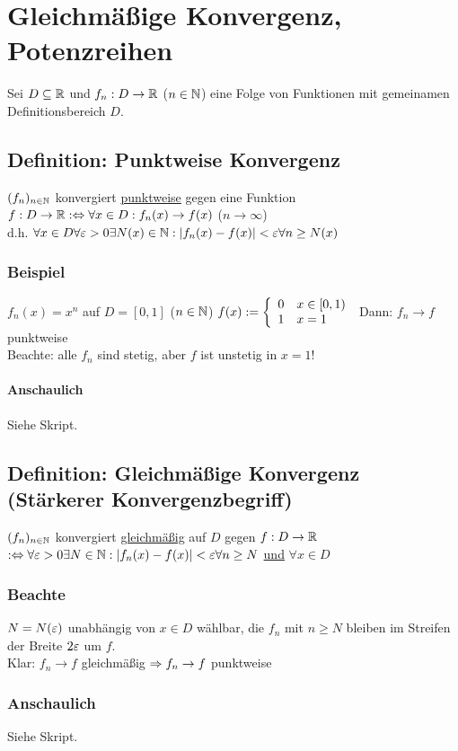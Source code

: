 \chapter{Gleichmäßige Konvergenz, Potenzreihen}\label{P13}
Sei $D \subseteq \mathbb{R}$ und $f_n: D \to \mathbb{R}$ ($n \in \mathbb{N}$) eine Folge von Funktionen mit gemeinamen Definitionsbereich $D$.

\section{Definition: Punktweise Konvergenz}\label{13.1}
$(f_n)_{n \in \mathbb{N}}$ konvergiert \underline{punktweise} gegen eine Funktion $f: D \to \mathbb{R} :\Leftrightarrow \forall x \in D: f_n(x) \to f(x)$ ($n \to \infty$)\\
d.h. $\forall x \in D \forall \varepsilon > 0 \exists N(x) \in \mathbb{N}: |f_n(x)-f(x)| < \varepsilon \forall n \ge N(x)$

\subsection*{Beispiel}
$f_n(x) = x^n$ auf $D = [0,1]$ ($n \in \mathbb{N}$)\nl
$f(x) := \left\{\begin{array}{l l} 0 & x \in [0,1) \\ 1 & x=1 \end{array} \right.$\nl
Dann: $f_n \to f$ punktweise\\
Beachte: alle $f_n$ sind stetig, aber $f$ ist unstetig in $x = 1$!

\subsubsection*{Anschaulich}
Siehe Skript.

\section{Definition: Gleichmäßige Konvergenz (Stärkerer Konvergenzbegriff)}\label{13.2}
$(f_n)_{n \in \mathbb{N}}$ konvergiert \underline{gleichmäßig} auf $D$ gegen $f: D \to \mathbb{R}$\\
$:\Leftrightarrow \forall \varepsilon > 0 \exists N \in \mathbb{N}: |f_n(x)-f(x)| < \varepsilon \forall n \ge N$ \underline{und} $\forall x \in D$

\subsection*{Beachte}
$N=N(\varepsilon)$ unabhängig von $x \in D$ wählbar, die $f_n$ mit $n \ge N$ bleiben im Streifen der Breite $2 \varepsilon$ um $f$.\\
Klar: $f_n \to f$ gleichmäßig $\Rightarrow f_n \to f$ punktweise

\subsection*{Anschaulich}
Siehe Skript.
